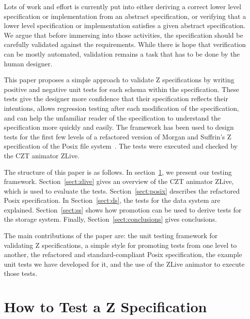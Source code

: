 \documentclass{llncs}
\begin{document}
Lots of work and effort is currently put into either deriving a
correct lower level specification or implementation from an abstract
specification, or verifying that a lower level specification or
implementation satisfies a given abstract specification.  We argue
that before immersing into those activities, the specification should
be carefully validated against the requirements.  While there is hope
that verification can be mostly automated, validation remains a
task that has to be done by the human designer.

This paper proposes a simple approach to validate Z specifications by
writing positive and negative unit tests for each schema within the
specification.  These tests give the designer more confidence that
their specification reflects their intentions, allows regression
testing after each modification of the specification, and can help the
unfamiliar reader of the specification to understand the specification
more quickly and easily.  The framework has been used to design tests
for the first few levels of a refactored version of Morgan and
Suffrin's Z specification of the Posix file
system~\cite{MorSufTOSE84}.  The tests were executed and checked by
the CZT animator ZLive.

The structure of this paper is as follows.  In
section~\ref{sect:framework}, we present our testing framework.
Section~\ref{sect:zlive} gives an overview of the CZT animator ZLive,
which is used to evaluate the tests.  Section~\ref{sect:posix}
describes the refactored Posix specification.  In
Section~\ref{sect:ds}, the tests for the data system are explained.
Section~\ref{sect:ss} shows how promotion can be used to derive tests
for the storage system.  Finally, Section~\ref{sect:conclusions} gives
conclusions.

The main contributions of the paper are: the unit testing framework
for validating Z specifications, a simple style for promoting tests
from one level to another, the refactored and standard-compliant Posix
specification, the example unit tests we have developed for it, and
the use of the ZLive animator to execute those tests.


\section{How to Test a Z Specification}\label{sect:framework}
\end{document}
